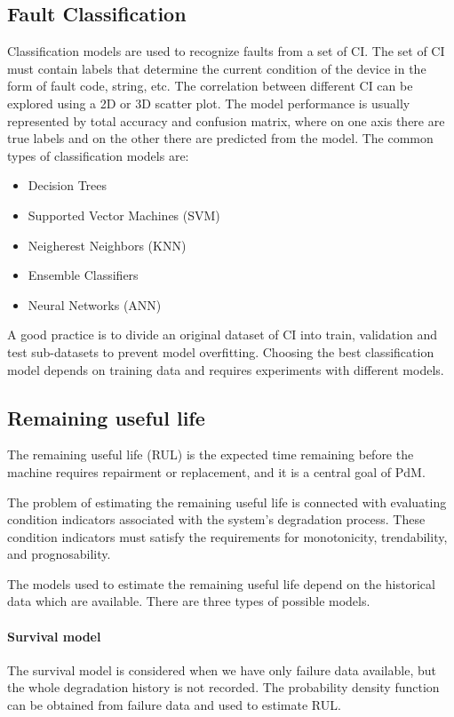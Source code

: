 \subsection{Fault Classification}
Classification models are used to recognize faults from a set of CI. The
set of CI must contain labels that determine the current condition of the
device in the form of fault code, string, etc. The correlation between
different CI can be explored using a 2D or 3D scatter plot. The model
performance is usually represented by total accuracy and confusion matrix,
where on one axis there are true labels and on the other there are
predicted from the model. The common types of classification models are:

\begin{itemize}
    \item Decision Trees
    \item Supported Vector Machines (SVM)
    \item Neigherest Neighbors (KNN)
    \item Ensemble Classifiers
    \item Neural Networks (ANN)
\end{itemize}

A good practice is to divide an original dataset of CI into train,
validation and test sub-datasets to prevent model overfitting. Choosing the
best classification model depends on training data and requires experiments
with different models.

\subsection{Remaining useful life}

The remaining useful life (RUL) is the expected time remaining before the
machine requires repairment or replacement, and it is a central goal of
PdM.

The problem of estimating the remaining useful life is connected with
evaluating condition indicators associated with the system's degradation
process. These condition indicators must satisfy the requirements for
monotonicity, trendability, and prognosability.

The models used to estimate the remaining useful life depend on the
historical data which are available. There are three types of possible
models. 

\paragraph{Survival model}
The survival model is considered when we have only failure data available,
but the whole degradation history is not recorded. The probability density
function can be obtained from failure data and used to estimate RUL.


